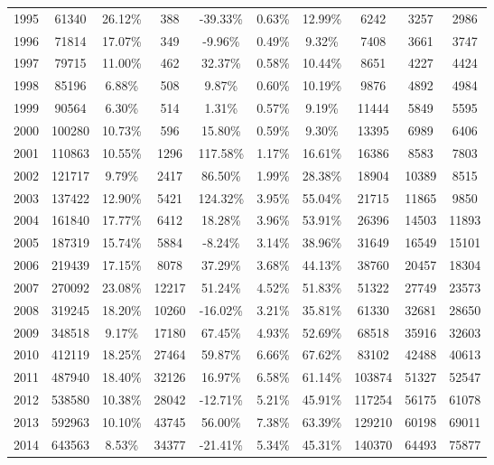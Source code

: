 \begin{table}[p]
{\begin{tabular}{@{}cccccccccc@{}}
1995 & 61340   & 26.12\% & 388   & -39.33\%  & 0.63\% & 12.99\% & 6242   & 3257  & 2986   \\
1996 & 71814   & 17.07\% & 349   & -9.96\%   & 0.49\% & 9.32\%  & 7408   & 3661  & 3747   \\
1997 & 79715   & 11.00\% & 462   & 32.37\%   & 0.58\% & 10.44\% & 8651   & 4227  & 4424   \\
1998 & 85196   & 6.88\%  & 508   & 9.87\%    & 0.60\% & 10.19\% & 9876   & 4892  & 4984   \\
1999 & 90564   & 6.30\%  & 514   & 1.31\%    & 0.57\% & 9.19\%  & 11444  & 5849  & 5595   \\
2000 & 100280  & 10.73\% & 596   & 15.80\%   & 0.59\% & 9.30\%  & 13395  & 6989  & 6406   \\
2001 & 110863  & 10.55\% & 1296  & 117.58\%  & 1.17\% & 16.61\% & 16386  & 8583  & 7803   \\
2002 & 121717  & 9.79\%  & 2417  & 86.50\%   & 1.99\% & 28.38\% & 18904  & 10389 & 8515   \\
2003 & 137422  & 12.90\% & 5421  & 124.32\%  & 3.95\% & 55.04\% & 21715  & 11865 & 9850   \\
2004 & 161840  & 17.77\% & 6412  & 18.28\%   & 3.96\% & 53.91\% & 26396  & 14503 & 11893  \\
2005 & 187319  & 15.74\% & 5884  & -8.24\%   & 3.14\% & 38.96\% & 31649  & 16549 & 15101  \\
2006 & 219439  & 17.15\% & 8078  & 37.29\%   & 3.68\% & 44.13\% & 38760  & 20457 & 18304  \\
2007 & 270092  & 23.08\% & 12217 & 51.24\%   & 4.52\% & 51.83\% & 51322  & 27749 & 23573  \\
2008 & 319245  & 18.20\% & 10260 & -16.02\%  & 3.21\% & 35.81\% & 61330  & 32681 & 28650  \\
2009 & 348518  & 9.17\%  & 17180 & 67.45\%   & 4.93\% & 52.69\% & 68518  & 35916 & 32603  \\
2010 & 412119  & 18.25\% & 27464 & 59.87\%   & 6.66\% & 67.62\% & 83102  & 42488 & 40613  \\
2011 & 487940  & 18.40\% & 32126 & 16.97\%   & 6.58\% & 61.14\% & 103874 & 51327 & 52547  \\
2012 & 538580  & 10.38\% & 28042 & -12.71\%  & 5.21\% & 45.91\% & 117254 & 56175 & 61078  \\
2013 & 592963  & 10.10\% & 43745 & 56.00\%   & 7.38\% & 63.39\% & 129210 & 60198 & 69011  \\
2014 & 643563  & 8.53\%  & 34377 & -21.41\%  & 5.34\% & 45.31\% & 140370 & 64493 & 75877  \\

\end{tabular}}
\end{table}
